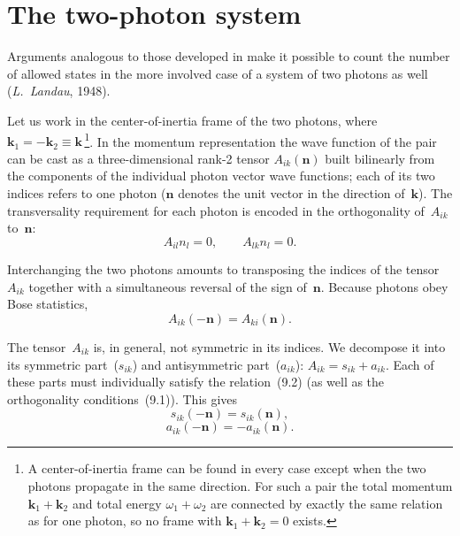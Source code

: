 \section{The two-photon system}

Arguments analogous to those developed in  make it possible to count the number of allowed states in the more involved case of a system of two photons as well (\emph{L.~Landau}, 1948).

Let us work in the center-of-inertia frame of the two photons, where $\mathbf{k}_1 = -\mathbf{k}_2 \equiv \mathbf{k}$\,\footnote{A center-of-inertia frame can be found in every case except when the two photons propagate in the same direction. For such a pair the total momentum $\mathbf{k}_1 + \mathbf{k}_2$ and total energy $\omega_1 + \omega_2$ are connected by exactly the same relation as for one photon, so no frame with $\mathbf{k}_1 + \mathbf{k}_2 = 0$ exists.}. In the momentum representation the wave function of the pair can be cast as a three-dimensional rank-2 tensor $A_{ik}(\mathbf{n})$ built bilinearly from the components of the individual photon vector wave functions; each of its two indices refers to one photon ($\mathbf{n}$ denotes the unit vector in the direction of~$\mathbf{k}$). The transversality requirement for each photon is encoded in the orthogonality of~$A_{ik}$ to~$\mathbf{n}$:
\begin{equation}
A_{il}n_l = 0, \qquad A_{lk}n_l = 0.
\tag{9.1}
\end{equation}

Interchanging the two photons amounts to transposing the indices of the tensor~$A_{ik}$ together with a simultaneous reversal of the sign of~$\mathbf{n}$. Because photons obey Bose statistics,
\begin{equation}
A_{ik}(-\mathbf{n}) = A_{ki}(\mathbf{n}).
\tag{9.2}
\end{equation}

The tensor~$A_{ik}$ is, in general, not symmetric in its indices. We decompose it into its symmetric part~($s_{ik}$) and antisymmetric part~($a_{ik}$): $A_{ik} = s_{ik} + a_{ik}$. Each of these parts must individually satisfy the relation~(9.2) (as well as the orthogonality conditions~(9.1)). This gives
\begin{equation}
s_{ik}(-\mathbf{n}) = s_{ik}(\mathbf{n}),
\tag{9.3}
\end{equation}
\begin{equation}
a_{ik}(-\mathbf{n}) = -a_{ik}(\mathbf{n}).
\tag{9.4}
\end{equation}


